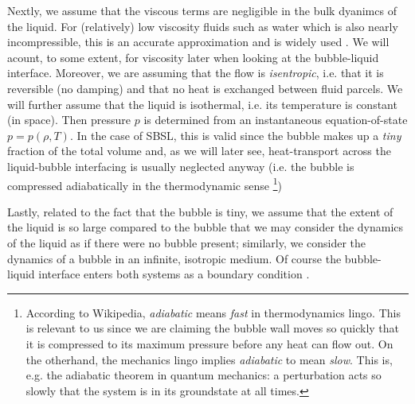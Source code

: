 \documentclass[rmp,aps,nofootinbib,superscriptaddress,floatfix]{revtex4-2}
\begin{document}
Nextly, we assume that the viscous terms are negligible in the bulk dyanimcs of the liquid. For (relatively) low viscosity fluids such as water which is also nearly incompressible, this is an accurate approximation and is widely used \cite{prosperetti1986bubble,prosperetti1999old,brenner2002single,plesset1977bubble}.  We will acount, to some extent, for viscosity later when looking at the bubble-liquid interface. Moreover, we are assuming that the flow is \emph{isentropic}, i.e. that it is reversible (no damping) and that no heat is exchanged between fluid parcels. We will further assume that the liquid is isothermal, i.e. its temperature is constant (in space). Then pressure $p$ is determined from an instantaneous equation-of-state $p=p(\rho,T)$. In the case of SBSL, this is valid since the bubble makes up a \emph{tiny} fraction of the total volume and, as we will later see, heat-transport across the liquid-bubble interfacing is usually neglected anyway (i.e. the bubble is compressed adiabatically in the thermodynamic sense \footnote{According to Wikipedia, \emph{adiabatic} means \emph{fast} in thermodynamics lingo. This is relevant to us since we are claiming the bubble wall moves so quickly that it is compressed to its maximum pressure before any heat can flow out. On the otherhand, the mechanics lingo implies \emph{adiabatic} to mean \emph{slow}. This is, e.g. the adiabatic theorem in quantum mechanics: a perturbation acts so slowly that the system is in its groundstate at all times.})

Lastly, related to the fact that the bubble is tiny, we assume that the extent of the liquid is so large compared to the bubble that we may consider the dynamics of the liquid as if there were no bubble present; similarly, we consider the dynamics of a bubble in an infinite, isotropic medium. Of course the bubble-liquid interface enters both systems as a boundary condition \cite{prosperetti1986bubble}. 
\end{document}
